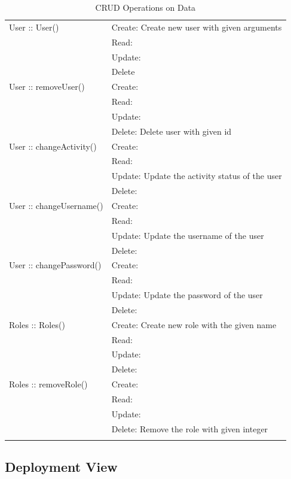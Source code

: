\begin{longtable}{|p{.3\linewidth}|p{.7\linewidth}|}
    User :: User() & Create: Create new user with given arguments \\
                 & Read: \\
                 & Update: \\
                 & Delete \\ \hline
    User :: removeUser() & Create: \\
                       & Read: \\
                       & Update: \\
                       & Delete: Delete user with given id \\ \hline
    User :: changeActivity() & Create: \\
                           & Read: \\
                           & Update: Update the activity status of the user \\
                           & Delete: \\ \hline
    User :: changeUsername() & Create: \\
                           & Read: \\
                           & Update: Update the username of the user \\
                           & Delete: \\ \hline
    User :: changePassword() & Create: \\
                           & Read: \\
                           & Update: Update the password of the user \\
                           & Delete: \\ \hline

    Roles :: Roles() & Create: Create new role with the given name \\
                   & Read: \\
                   & Update: \\
                   & Delete: \\ \hline
    Roles :: removeRole() & Create: \\
                        & Read: \\
                        & Update: \\
                        & Delete: Remove the role with given integer \\ \hline
  \caption{CRUD Operations on Data}
\end{longtable}

\subsection{Deployment View}


